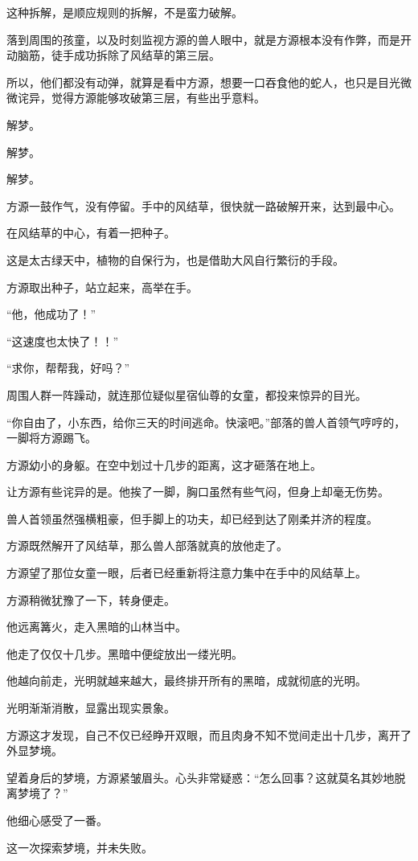 \begin{this_body}
这种拆解，是顺应规则的拆解，不是蛮力破解。

落到周围的孩童，以及时刻监视方源的兽人眼中，就是方源根本没有作弊，而是开动脑筋，徒手成功拆除了风结草的第三层。

所以，他们都没有动弹，就算是看中方源，想要一口吞食他的蛇人，也只是目光微微诧异，觉得方源能够攻破第三层，有些出乎意料。

解梦。

解梦。

解梦。

方源一鼓作气，没有停留。手中的风结草，很快就一路破解开来，达到最中心。

在风结草的中心，有着一把种子。

这是太古绿天中，植物的自保行为，也是借助大风自行繁衍的手段。

方源取出种子，站立起来，高举在手。

“他，他成功了！”

“这速度也太快了！！”

“求你，帮帮我，好吗？”

周围人群一阵躁动，就连那位疑似星宿仙尊的女童，都投来惊异的目光。

“你自由了，小东西，给你三天的时间逃命。快滚吧。”部落的兽人首领气哼哼的，一脚将方源踢飞。

方源幼小的身躯。在空中划过十几步的距离，这才砸落在地上。

让方源有些诧异的是。他挨了一脚，胸口虽然有些气闷，但身上却毫无伤势。

兽人首领虽然强横粗豪，但手脚上的功夫，却已经到达了刚柔并济的程度。

方源既然解开了风结草，那么兽人部落就真的放他走了。

方源望了那位女童一眼，后者已经重新将注意力集中在手中的风结草上。

方源稍微犹豫了一下，转身便走。

他远离篝火，走入黑暗的山林当中。

他走了仅仅十几步。黑暗中便绽放出一缕光明。

他越向前走，光明就越来越大，最终排开所有的黑暗，成就彻底的光明。

光明渐渐消散，显露出现实景象。

方源这才发现，自己不仅已经睁开双眼，而且肉身不知不觉间走出十几步，离开了外显梦境。

望着身后的梦境，方源紧皱眉头。心头非常疑惑：“怎么回事？这就莫名其妙地脱离梦境了？”

他细心感受了一番。

这一次探索梦境，并未失败。


\end{this_body}
